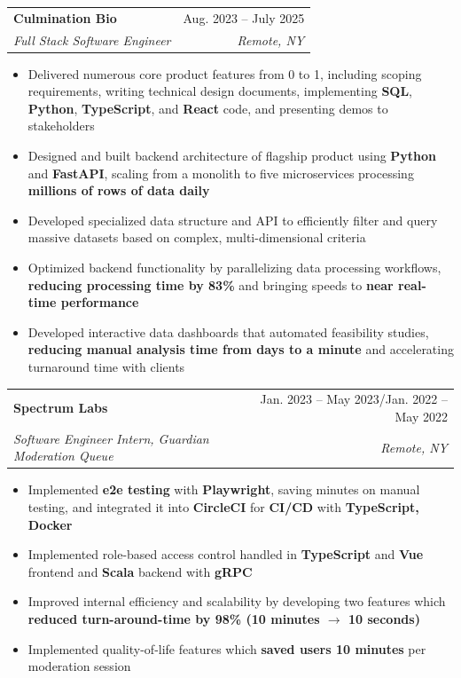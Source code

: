 \documentclass[letterpaper,11pt]{article}
\makeatletter
\newcommand{\resumeItem}[1]{
  \item\small{
    {#1 \vspace{-2pt}}
  }
}
\newcommand{\resumeSubheading}[4]{
  \vspace{-2pt}\item
    \begin{tabular*}{0.97\textwidth}[t]{l@{\extracolsep{\fill}}r}
      \textbf{#1} & #2 \\
      \textit{\small#3} & \textit{\small #4} \\
    \end{tabular*}\vspace{-7pt}
}
\newcommand{\resumeSubSubheading}[2]{
    \item
    \begin{tabular*}{0.97\textwidth}{l@{\extracolsep{\fill}}r}
      \textit{\small#1} & \textit{\small #2} \\
    \end{tabular*}\vspace{-7pt}
}
\newcommand{\resumeSubHeadingListEnd}{\end{itemize}}
\newcommand{\resumeItemListStart}{\begin{itemize}[itemsep=0pt]}
\newcommand{\resumeItemListEnd}{\end{itemize}\vspace{-5pt}}
\makeatother
\begin{document}
    \resumeSubheading
      {Culmination Bio}{Aug. 2023 -- July 2025}
      {Full Stack Software Engineer}{Remote, NY}
      \resumeItemListStart
        \resumeItem{Delivered numerous core product features from 0 to 1, including scoping requirements, writing technical design documents, implementing \textbf{SQL}, \textbf{Python}, \textbf{TypeScript}, and \textbf{React} code, and presenting demos to stakeholders}
        \resumeItem{Designed and built backend architecture of flagship product using \textbf{Python} and \textbf{FastAPI}, scaling from a monolith to five microservices processing \textbf{millions of rows of data daily}}
        \resumeItem{Developed specialized data structure and API to efficiently filter and query massive datasets based on complex, multi-dimensional criteria}
        \resumeItem{Optimized backend functionality by parallelizing data processing workflows, \textbf{reducing processing time by 83\%} and bringing speeds to \textbf{near real-time performance}}
        \resumeItem{Developed interactive data dashboards that automated feasibility studies, \textbf{reducing manual analysis time from days to a minute} and accelerating turnaround time with clients}
      \resumeItemListEnd

    \resumeSubheading
      {Spectrum Labs}{Jan. 2023 -- May 2023/Jan. 2022 -- May 2022}
      {Software Engineer Intern, Guardian Moderation Queue}{Remote, NY}
      \resumeItemListStart
        \resumeItem{Implemented \textbf{e2e testing} with \textbf{Playwright}, saving minutes on manual testing, and integrated it into \textbf{CircleCI} for \textbf{CI/CD }with \textbf{TypeScript, Docker}}
        \resumeItem{Implemented role-based access control handled in \textbf{TypeScript} and \textbf{Vue} frontend and \textbf{Scala} backend with \textbf{gRPC}}
        \resumeItem{Improved internal efficiency and scalability by developing two features which \textbf{reduced turn-around-time by 98\% (10 minutes $\rightarrow$ 10 seconds)}}
        \resumeItem{Implemented quality-of-life features which \textbf{saved users 10 minutes} per moderation session}
      \resumeItemListEnd
      
\end{document}
